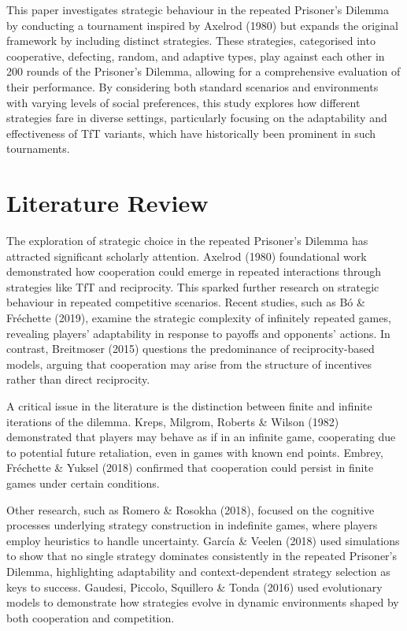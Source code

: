 \documentclass[11pt,preprint]{elsarticle}
\numberwithin{equation}{section}
\numberwithin{figure}{section}
\numberwithin{table}{section}
\begin{document}
This paper investigates strategic behaviour in the repeated Prisoner's
Dilemma by conducting a tournament inspired by Axelrod (1980) but
expands the original framework by including distinct strategies. These
strategies, categorised into cooperative, defecting, random, and
adaptive types, play against each other in 200 rounds of the Prisoner's
Dilemma, allowing for a comprehensive evaluation of their performance.
By considering both standard scenarios and environments with varying
levels of social preferences, this study explores how different
strategies fare in diverse settings, particularly focusing on the
adaptability and effectiveness of TfT variants, which have historically
been prominent in such tournaments.

\section{\texorpdfstring{Literature
Review\label{litreview}}{Literature Review}}\label{literature-review}

The exploration of strategic choice in the repeated Prisoner's Dilemma
has attracted significant scholarly attention. Axelrod (1980)
foundational work demonstrated how cooperation could emerge in repeated
interactions through strategies like TfT and reciprocity. This sparked
further research on strategic behaviour in repeated competitive
scenarios. Recent studies, such as Bó \& Fréchette (2019), examine the
strategic complexity of infinitely repeated games, revealing players'
adaptability in response to payoffs and opponents' actions. In contrast,
Breitmoser (2015) questions the predominance of reciprocity-based
models, arguing that cooperation may arise from the structure of
incentives rather than direct reciprocity.

A critical issue in the literature is the distinction between finite and
infinite iterations of the dilemma. Kreps, Milgrom, Roberts \& Wilson
(1982) demonstrated that players may behave as if in an infinite game,
cooperating due to potential future retaliation, even in games with
known end points. Embrey, Fréchette \& Yuksel (2018) confirmed that
cooperation could persist in finite games under certain conditions.

Other research, such as Romero \& Rosokha (2018), focused on the
cognitive processes underlying strategy construction in indefinite
games, where players employ heuristics to handle uncertainty. García \&
Veelen (2018) used simulations to show that no single strategy dominates
consistently in the repeated Prisoner's Dilemma, highlighting
adaptability and context-dependent strategy selection as keys to
success. Gaudesi, Piccolo, Squillero \& Tonda (2016) used evolutionary
models to demonstrate how strategies evolve in dynamic environments
shaped by both cooperation and competition.
\end{document}
